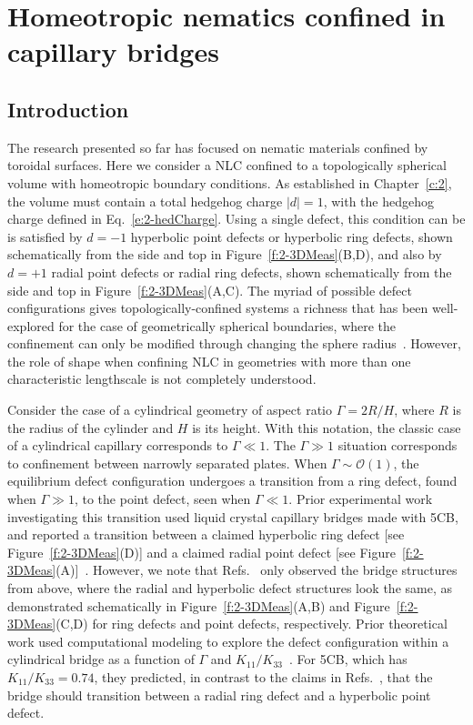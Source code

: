 \chapter{Homeotropic nematics confined in capillary bridges}

\section{Introduction}
The research presented so far has focused on nematic materials confined by toroidal surfaces.
Here we consider a NLC confined to a topologically spherical volume with homeotropic boundary conditions.
As established in Chapter~\ref{c:2}, the volume must contain a total hedgehog charge $|d| = 1$, with the hedgehog charge defined in Eq.~\ref{e:2-hedCharge}.
Using a single defect, this condition can be is satisfied by $d=-1$ hyperbolic point defects or hyperbolic ring defects, shown schematically from the side and top in Figure~\ref{f:2-3DMeas}(B,D), and also by $d=+1$ radial point defects or radial ring defects, shown schematically from the side and top in Figure~\ref{f:2-3DMeas}(A,C).
The myriad of possible defect configurations gives topologically-confined systems a richness that has been well-explored for the case of geometrically spherical boundaries, where the confinement can only be modified through changing the sphere radius~\cite{RN150,RN277,RN278,RN275,RN276}.
However, the role of shape when confining NLC in geometries with more than one characteristic lengthscale is not completely understood.

Consider the case of a cylindrical geometry of aspect ratio $\Gamma = 2 R/H$, where $R$ is the radius of the cylinder and $H$ is its height.
With this notation, the classic case of a cylindrical capillary corresponds to $\Gamma \ll 1$. The $\Gamma \gg 1$ situation corresponds to confinement between narrowly separated plates.
When $\Gamma \sim \mathcal{O}\left( 1 \right)$, the equilibrium defect configuration undergoes a transition from a ring defect, found when $\Gamma \gg 1$, to the point defect, seen when $\Gamma \ll 1$.
Prior experimental work investigating this transition used liquid crystal capillary bridges made with 5CB, and reported a transition between a claimed hyperbolic ring defect [see Figure~\ref{f:2-3DMeas}(D)] and a claimed radial point defect [see Figure~\ref{f:2-3DMeas}(A)]~\cite{RN139,RN147}.
However, we note that Refs.~\cite{RN139,RN147} only observed the bridge structures from above, where the radial and hyperbolic defect structures look the same, as demonstrated schematically in Figure~\ref{f:2-3DMeas}(A,B) and Figure~\ref{f:2-3DMeas}(C,D) for ring defects and point defects, respectively.
Prior theoretical work used computational modeling to explore the defect configuration within a cylindrical bridge as a function of $\Gamma$ and $K_{11}/K_{33}$~\cite{RN138,RN144}.
For 5CB, which has $K_{11}/K_{33} = 0.74$, they predicted, in contrast to the claims in Refs.~\cite{RN139,RN147}, that the bridge should transition between a radial ring defect and a hyperbolic point defect.

